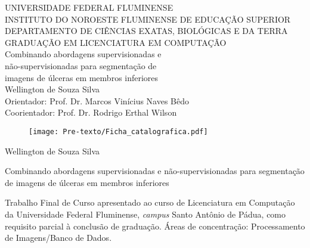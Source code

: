 \begin{center}

  {\large UNIVERSIDADE FEDERAL FLUMINENSE}
  \\[0.2cm]
  {\large INSTITUTO DO NOROESTE FLUMINENSE DE EDUCAÇÃO SUPERIOR}
  \\[0.2cm]
  {\large DEPARTAMENTO DE CIÊNCIAS EXATAS, BIOLÓGICAS E DA TERRA}
  \\[0.2cm]
  {\large GRADUAÇÃO EM LICENCIATURA EM COMPUTAÇÃO}
  \\[7cm]
  { \huge Combinando abordagens supervisionadas e }
  \\[0.25cm]
 {\huge  não-supervisionadas para segmentação de }
  \\[0.25cm]
  {\huge imagens de úlceras em membros inferiores} 
  \\[9cm]


{\large Wellington de Souza Silva}
\\[0.2cm]
{\large Orientador: Prof. Dr. Marcos Vinícius Naves Bêdo}
\\[0.2cm]
{\large Coorientador: Prof. Dr. Rodrigo Erthal Wilson}
\\[0.2cm]
\end{center}

\newpage
\blankpage

\imprimirfolhaderosto

\begin{figure}[!htb]
    \centering
    \vspace{-30px}
    \texttt{[image: Pre-texto/Ficha\_catalografica.pdf]}
\end{figure}

\newpage

\vspace{1.5cm}
\begin{center}
\large{Wellington de Souza Silva}

\vspace{1.5cm}

{\Large{Combinando abordagens supervisionadas e não-supervisionadas para segmentação de imagens de úlceras em membros inferiores}}

\end{center}

\vspace{1cm}

\begin{flushright}
\begin{minipage}{15.6cm} 
Trabalho Final de Curso apresentado ao curso de Licenciatura em Computação da Universidade Federal Fluminense, \textit{campus} Santo Antônio de Pádua, como requisito parcial à conclusão de graduação.
Áreas de concentração: Processamento de Imagens/Banco de Dados.
\end{minipage}
\end{flushright}


